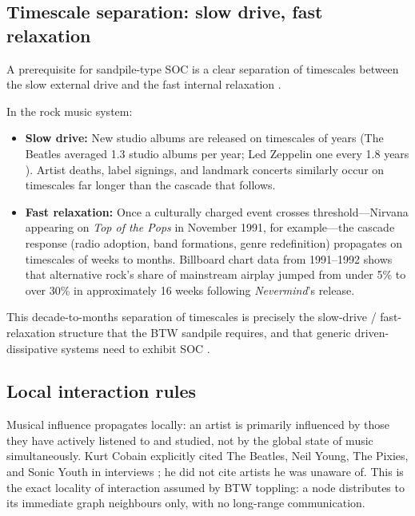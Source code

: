 \documentclass[12pt, a4paper]{article}
\begin{document}
\subsection{Timescale separation: slow drive, fast relaxation}

A prerequisite for sandpile-type SOC is a clear separation of
timescales between the slow external drive and the fast internal
relaxation \citep{jensen1998, christensen2005}.

In the rock music system:
\begin{itemize}
  \item \textbf{Slow drive:} New studio albums are released on
    timescales of years (The Beatles averaged 1.3 studio albums
    per year; Led Zeppelin one every 1.8 years
    \citep{discogsbeatles, discogsledzep}).
    Artist deaths, label signings, and landmark concerts
    similarly occur on timescales far longer than the cascade
    that follows.
  \item \textbf{Fast relaxation:} Once a culturally charged event
    crosses threshold---Nirvana appearing on \textit{Top of the Pops}
    in November 1991, for example---the cascade response (radio
    adoption, band formations, genre redefinition) propagates on
    timescales of weeks to months.
    Billboard chart data from 1991--1992 \citep{billboardarchive}
    shows that alternative rock's share of mainstream airplay
    jumped from under 5\% to over 30\% in approximately
    16 weeks following \textit{Nevermind}'s release.
\end{itemize}

This decade-to-months separation of timescales is precisely the
slow-drive / fast-relaxation structure that the BTW sandpile
requires, and that generic driven-dissipative systems need to
exhibit SOC \citep{bak1987, grinstein1995}.

\subsection{Local interaction rules}

Musical influence propagates locally: an artist is primarily
influenced by those they have actively listened to and studied,
not by the global state of music simultaneously.
Kurt Cobain explicitly cited The Beatles, Neil Young, The Pixies,
and Sonic Youth in interviews \citep{cross2001, azerrad1994};
he did not cite artists he was unaware of.
This is the exact locality of interaction assumed by BTW toppling:
a node distributes to its immediate graph neighbours only,
with no long-range communication.
\end{document}
